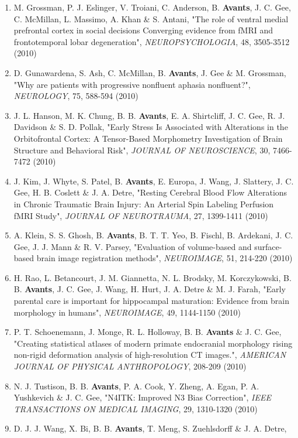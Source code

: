 \documentclass[11pt]{moderncv} %
\begin{document}
\begin{enumerate}
{\em CEREBRAL CORTEX}, 20, 2453-2463 (2010)
\item M. Grossman, P. J. Eslinger, V. Troiani, C. Anderson, B. \textbf{Avants}, J. C. Gee, C. McMillan, L. Massimo, A. Khan \&  S. Antani, 
"The role of ventral medial prefrontal cortex in social decisions Converging evidence from fMRI and frontotemporal lobar degeneration", 
{\em NEUROPSYCHOLOGIA}, 48, 3505-3512 (2010)
\item D. Gunawardena, S. Ash, C. McMillan, B. \textbf{Avants}, J. Gee \&  M. Grossman, 
"Why are patients with progressive nonfluent aphasia nonfluent?", 
{\em NEUROLOGY}, 75, 588-594 (2010)
\item J. L. Hanson, M. K. Chung, B. B. \textbf{Avants}, E. A. Shirtcliff, J. C. Gee, R. J. Davidson \&  S. D. Pollak, 
"Early Stress Is Associated with Alterations in the Orbitofrontal Cortex: A Tensor-Based Morphometry Investigation of Brain Structure and Behavioral Risk", 
{\em JOURNAL OF NEUROSCIENCE}, 30, 7466-7472 (2010)
\item J. Kim, J. Whyte, S. Patel, B. \textbf{Avants}, E. Europa, J. Wang, J. Slattery, J. C. Gee, H. B. Coslett \&  J. A. Detre, 
"Resting Cerebral Blood Flow Alterations in Chronic Traumatic Brain Injury: An Arterial Spin Labeling Perfusion fMRI Study", 
{\em JOURNAL OF NEUROTRAUMA}, 27, 1399-1411 (2010)
\item A. Klein, S. S. Ghosh, B. \textbf{Avants}, B. T. T. Yeo, B. Fischl, B. Ardekani, J. C. Gee, J. J. Mann \&  R. V. Parsey, 
"Evaluation of volume-based and surface-based brain image registration methods", 
{\em NEUROIMAGE}, 51, 214-220 (2010)
\item H. Rao, L. Betancourt, J. M. Giannetta, N. L. Brodsky, M. Korczykowski, B. B. \textbf{Avants}, J. C. Gee, J. Wang, H. Hurt, J. A. Detre \&  M. J. Farah, 
"Early parental care is important for hippocampal maturation: Evidence from brain morphology in humans", 
{\em NEUROIMAGE}, 49, 1144-1150 (2010)
\item P. T. Schoenemann, J. Monge, R. L. Holloway, B. B. \textbf{Avants} \&  J. C. Gee, 
"Creating statistical atlases of modern primate endocranial morphology rising non-rigid deformation analysis of high-resolution CT images.", 
{\em AMERICAN JOURNAL OF PHYSICAL ANTHROPOLOGY}, 208-209 (2010)
\item N. J. Tustison, B. B. \textbf{Avants}, P. A. Cook, Y. Zheng, A. Egan, P. A. Yushkevich \&  J. C. Gee, 
"N4ITK: Improved N3 Bias Correction", 
{\em IEEE TRANSACTIONS ON MEDICAL IMAGING}, 29, 1310-1320 (2010)
\item D. J. J. Wang, X. Bi, B. B. \textbf{Avants}, T. Meng, S. Zuehlsdorff \&  J. A. Detre, 

\end{enumerate}
\end{document}
